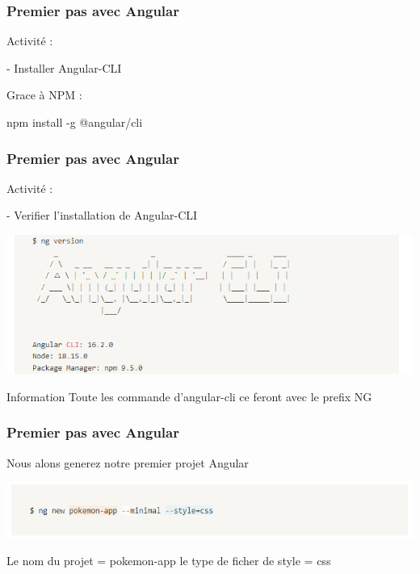 \documentclass[10pt]{beamer}
\begin{document}
	\begin{frame}
		\frametitle{Premier pas avec Angular}

		Activité : \newline \newline

		- Installer Angular-CLI  \newline \newline

		Grace à NPM :  \newline \newline

		npm install -g @angular/cli


	\end{frame}

	\begin{frame}
		\frametitle{Premier pas avec Angular}

		Activité : \newline \newline

		- Verifier l'installation de Angular-CLI  \newline \newline

		\includegraphics[width=16cm]{assets/angularCLInstall} \newline

		\begin{block}{Information}
			Toute les commande d'angular-cli ce feront avec le prefix NG
		\end{block}

	\end{frame}

	\begin{frame}
		\frametitle{Premier pas avec Angular}

		Nous alons generez notre premier projet Angular \newline \newline

		\includegraphics[width=16cm]{assets/angularsetup} \newline \newline

		Le nom du projet = pokemon-app \newline
		le type de ficher de style = css

	\end{frame}
\end{document}
